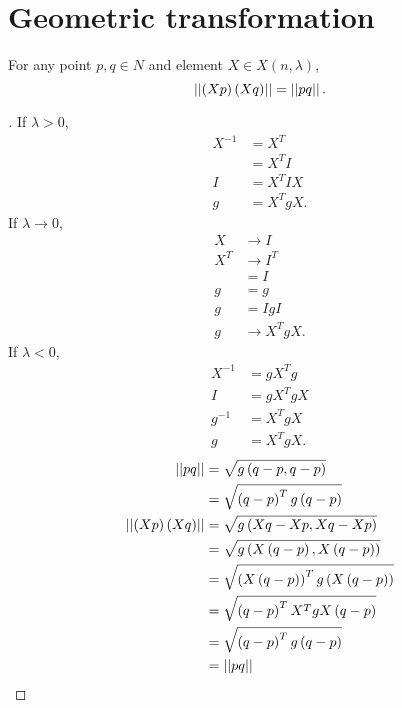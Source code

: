 \documentclass[../main.tex]{subfiles}
\begin{document}
\section{Geometric transformation}
\begin{lemma}\label{M:transform:distance}
For any point \(p,q\in N\)
and element \(X\in X\left(n,\lambda\right)\),
\[
\left|\left|{\left(Xp\right)\left(Xq\right)}\right|\right|=\left|\left|{pq}\right|\right|\text{.}
\]
\end{lemma}
\begin{proof}[]
If \(\lambda>0\),
\begin{align*}
X^{-1}&=X^T\\
&=X^TI\\
I&=X^TIX\\
g&=X^TgX\text{.}
\end{align*}
If \(\lambda\to 0\),
\begin{align*}
X&\to I\\
X^T
&\to I^T\\
&=I\\
g&=g\\
g&=IgI\\
g&\to X^TgX\text{.}
\end{align*}
If \(\lambda<0\),
\begin{align*}
X^{-1}&=gX^Tg\\
I&=gX^TgX\\
g^{-1}&=X^TgX\\
g&=X^TgX\text{.}
\end{align*}
\begin{align*}
\left|\left|{pq}\right|\right|
&=\sqrt{g\left(q-p,q-p\right)}\\
&=\sqrt{\left(q-p\right)^Tg\left(q-p\right)}\\
\left|\left|{\left(Xp\right)\left(Xq\right)}\right|\right|
&=\sqrt{g\left(Xq-Xp,Xq-Xp\right)}\\
&=\sqrt{g\left(X\left(q-p\right),X\left(q-p\right)\right)}\\
&=\sqrt{\left(X\left(q-p\right)\right)^Tg\left(X\left(q-p\right)\right)}\\
&=\sqrt{\left(q-p\right)^TX^TgX\left(q-p\right)}\\
&=\sqrt{\left(q-p\right)^Tg\left(q-p\right)}\\
&=\left|\left|{pq}\right|\right|\qedhere
\end{align*}
\end{proof}
\end{document}
